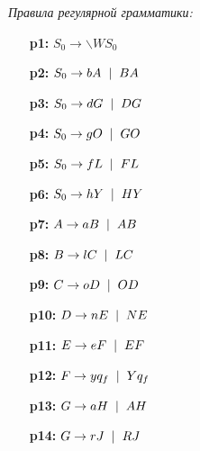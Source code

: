 \documentclass[a4paper,10pt]{article}
\begin{document}
		\textit{Правила регулярной грамматики:}
	\begin{itemize}
		\item[\textbf{p1:}] $S_0 \to \backslash WS_0$
		\item[\textbf{p2:}] $S_0 \to bA \hspace{2mm} | \hspace{2mm} BA$
		\item[\textbf{p3:}] $S_0 \to dG \hspace{2mm} | \hspace{2mm} DG$
		\item[\textbf{p4:}] $S_0 \to gO \hspace{2mm} | \hspace{2mm} GO$
		\item[\textbf{p5:}] $S_0 \to fL \hspace{2mm} | \hspace{2mm} FL$
		\item[\textbf{p6:}] $S_0 \to hY \hspace{2mm} | \hspace{2mm} HY$
		\item[\textbf{p7:}] $A \to aB \hspace{2mm} | \hspace{2mm} AB$
		\item[\textbf{p8:}] $B \to lC \hspace{2mm} | \hspace{2mm} LC$
		\item[\textbf{p9:}] $C \to oD \hspace{2mm} | \hspace{2mm} OD$
		\item[\textbf{p10:}] $D \to nE \hspace{2mm} | \hspace{2mm} NE$
		\item[\textbf{p11:}] $E \to eF \hspace{2mm} | \hspace{2mm} EF$
		\item[\textbf{p12:}] $F \to yq_{f} \hspace{2mm} | \hspace{2mm} Yq_{f}$
		\item[\textbf{p13:}] $G \to aH \hspace{2mm} | \hspace{2mm} AH$
		\item[\textbf{p14:}] $G \to rJ \hspace{2mm} | \hspace{2mm} RJ$

\end{itemize}
\end{document}
